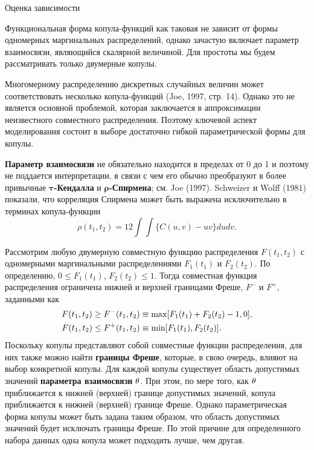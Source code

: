         \begin{center}Оценка зависимости\end{center} %
        \noindent
Функциональная форма копула-функций как таковая не зависит от формы одномерных маргинальных распределений, однако зачастую включает параметр взаимосвязи, являющийся скалярной величиной. Для простоты мы будем рассматривать только двумерные копулы.

Многомерному распределению дискретных случайных величин может соответствовать несколько копула-функций (Joe, 1997, стр. 14). Однако это не является основной проблемой, которая заключается в аппроксимации неизвестного совместного распределения. Поэтому ключевой аспект моделирования состоит в выборе достаточно гибкой параметрической формы для копулы.

\textbf{Параметр взаимосвязи} не обязательно находится в пределах от 0 до 1 и поэтому не поддается интерпретации, в связи с чем его обычно преобразуют в более привычные \textbf{$\bm{\tau}$-Кендалла} и \textbf{$\bm{\rho}$-Спирмена}; см. Joe (1997). Schweizer и Wolff (1981) показали, что корреляция Спирмена может быть выражена исключительно в терминах копула-функции
    $$\rho(t_1,t_2) = 12 \int\int{\{C(u,v) - uv\}}dudv.$$

Рассмотрим любую двумерную совместную функцию распределения $F(t_1, t_2)$ с одномерными маргинальными распределениями $F_1(t_1)$ и $F_2(t_2)$. По определению, $0 \le F_1(t_1)$, $F_2(t_2) \le 1$. Тогда совместная функция распределения ограничена нижней и верхней границами Фреше, $F^-$ и $F^+$, заданными как
    \begin{align}
    F(t_1,t_2) \ge F^{-}(t_1,t_2) &\equiv \max[F_1(t_1) + F_2(t_2) - 1, 0], \notag \\
    F(t_1,t_2) \le F^{+}(t_1,t_2) &\equiv \min[F_1(t_1), F_2(t_2)]. \notag
    \end{align}
Поскольку копулы представляют собой совместные функции распределения, для них также можно найти \textbf{границы Фреше}, которые, в свою очередь, влияют на выбор конкретной копулы. Для каждой копулы существует область допустимых значений \textbf{параметра взаимосвязи} $\theta$. При этом, по мере того, как $\theta$ приближается к нижней (верхней) границе допустимых значений, копула приближается к нижней (верхней) границе Фреше. Однако параметрическая форма копулы может быть задана таким образом, что область допустимых значений будет исключать границы Фреше. По этой причине для определенного набора данных одна копула может подходить лучше, чем другая.



